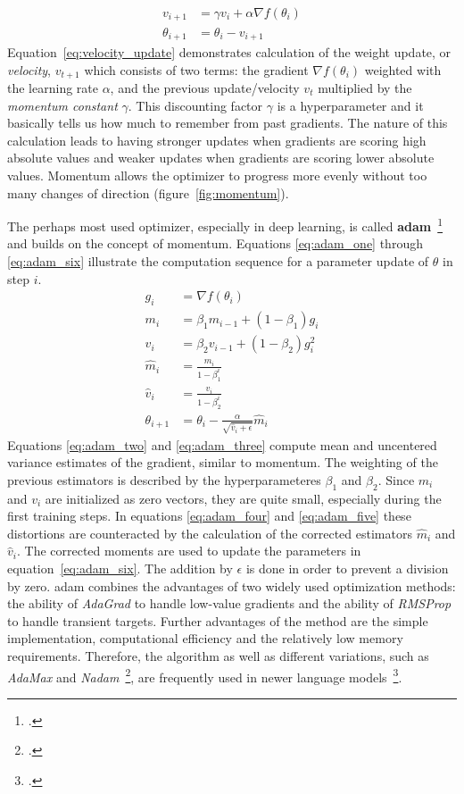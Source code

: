 \begin{align}
	v_{i+1} &= \gamma v_i + \alpha \nabla f(\theta_i) \label{eq:velocity_update} \\
	\theta_{i+1} &= \theta_i - v_{i+1} \label{momentum_update}
\end{align}
Equation~\ref{eq:velocity_update} demonstrates calculation of the weight update, or \textit{velocity}, $ v_{t+1} $ which consists of two terms: the gradient $ \nabla f(\theta_i) $ weighted with the learning rate $ \alpha $, and the previous update/velocity $ v_t $ multiplied by the \textit{momentum constant} $ \gamma $. This discounting factor $ \gamma $ is a hyperparameter and it basically tells us how much to remember from past gradients. The nature of this calculation leads to having stronger updates when gradients are scoring high absolute values and weaker updates when gradients are scoring lower absolute values. Momentum allows the optimizer to progress more evenly without too many changes of direction (figure~\ref{fig:momentum}).

The perhaps most used optimizer, especially in deep learning, is called \textbf{\gls{adam}}~\footcite{kingma2014adam} and builds on the concept of momentum. Equations \ref{eq:adam_one} through \ref{eq:adam_six} illustrate the computation sequence for a parameter update of $ \theta $ in step $ i $.
\begin{align}
	g_i &= \nabla f(\theta_i) \label{eq:adam_one} \\
	m_i &= \beta_1 m_{i-1} + (1 - \beta_1) g_i \label{eq:adam_two} \\
	v_i &= \beta_2 v_{i-1} + (1 - \beta_2) g_i^2 \label{eq:adam_three} \\
	\hat{m}_i &= \frac{m_i}{1  - \beta_1^i} \label{eq:adam_four} \\
	\hat{v}_i &= \frac{v_i}{1 - \beta_2^i} \label{eq:adam_five} \\
	\theta_{i+1} &= \theta_i - \frac{\alpha}{\sqrt{\hat{v}_i + \epsilon}} \hat{m}_i \label{eq:adam_six} 
\end{align}
Equations \ref{eq:adam_two} and \ref{eq:adam_three} compute mean and uncentered variance estimates of the gradient, similar to momentum. The weighting of the previous estimators is described by the hyperparameteres $ \beta_1 $ and $ \beta_2 $. Since $ m_i $ and $ v_i $ are initialized as zero vectors, they are quite small, especially during the first training steps. In equations \ref{eq:adam_four} and \ref{eq:adam_five} these distortions are counteracted by the calculation of the corrected estimators $ \hat{m}_i $ and $ \hat{v}_i $. The corrected moments are used to update the parameters in equation~\ref{eq:adam_six}. The addition by $ \epsilon $ is done in order to prevent a division by zero. \gls{adam} combines the advantages of two widely used optimization methods: the ability of \textit{AdaGrad} to handle low-value gradients and the ability of \textit{RMSProp} to handle transient targets.  Further advantages of the method are the simple implementation, computational efficiency and the relatively low memory requirements. Therefore, the algorithm as well as different variations, such as \textit{AdaMax} and \textit{Nadam}~\footcite{dozat2016incorporating}, are frequently used in newer language models~\footcite{nyamen2018improveadam}.

